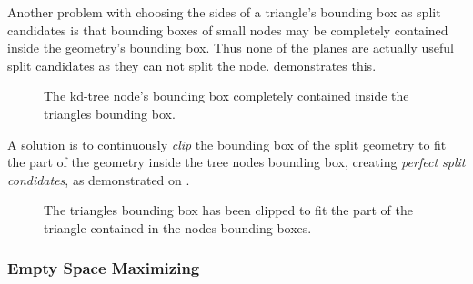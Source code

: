Another problem with choosing the sides of a triangle's bounding box
as split candidates is that bounding boxes of small nodes may be
completely contained inside the geometry's bounding box. Thus none of
the planes are actually useful split candidates as they can not split
the node.  demonstrates this.

\begin{figure}
  \centering
    
  \vspace{3mm}
  \parbox{5cm}{\caption[A tree node's bounding box contained in a
      triangle's bounding box.]{The kd-tree node's bounding box
      completely contained inside the triangles bounding
      box.}\label{fig:aabbContained}}
\end{figure}

A solution is to continuously \textit{clip} the bounding box of the
split geometry to fit the part of the geometry inside the tree nodes
bounding box, creating \textit{perfect split condidates}, as
demonstrated on .

\begin{figure}
  \centering

  \vspace{3mm}
  \parbox{5cm}{ \caption[Triangle clipping.]{The triangles bounding
      box has been clipped to fit the part of the triangle contained
      in the nodes bounding boxes.}\label{fig:aabbClipped}}
\end{figure}


\subsubsection{Empty Space Maximizing}\label{sec:emptySpace}

